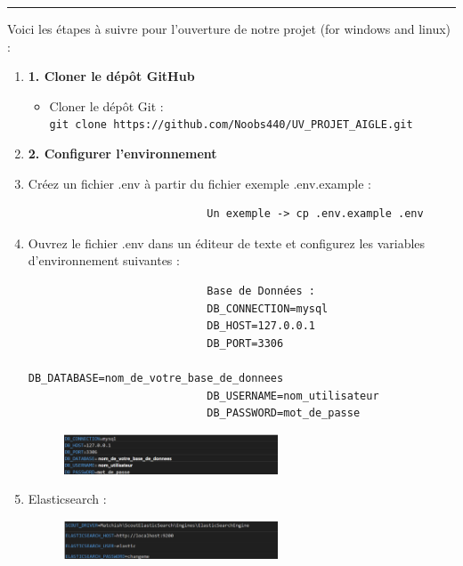 \documentclass[12pt]{article}
\begin{document}
            \rule{linewidth}{0.3pt}
            Voici les étapes à suivre pour l’ouverture de notre projet (for windows and linux) :
            \begin{enumerate}
                \item \textbf{1. Cloner le dépôt GitHub}
                    \begin{itemize}
                        \item Cloner le dépôt Git :\\
                        \texttt{git clone https://github.com/Noobs440/UV_PROJET_AIGLE.git}
                    \end{itemize}
                \item \textbf{2. Configurer l’environnement}
                    \item Créez un fichier .env à partir du fichier exemple .env.example :
                        \begin{lstlisting}
                            Un exemple -> cp .env.example .env
                        \end{lstlisting}
                    \item Ouvrez le fichier .env dans un éditeur de texte et configurez les variables d'environnement suivantes :
                        \begin{lstlisting}
                            Base de Données :
                            DB_CONNECTION=mysql
                            DB_HOST=127.0.0.1
                            DB_PORT=3306
                            DB_DATABASE=nom_de_votre_base_de_donnees
                            DB_USERNAME=nom_utilisateur
                            DB_PASSWORD=mot_de_passe
                        \end{lstlisting}
                        \begin{figure}[h] 
                            \centering 
                            \includegraphics[width=0.6\textwidth]{./img/bd.png} 
                        \end{figure}
                    \item Elasticsearch :
                        \begin{figure}[h]
                            \centering
                            \includegraphics[width=0.6\textwidth]{./img/elas.png}

\end{figure}
\end{enumerate}
\end{document}
